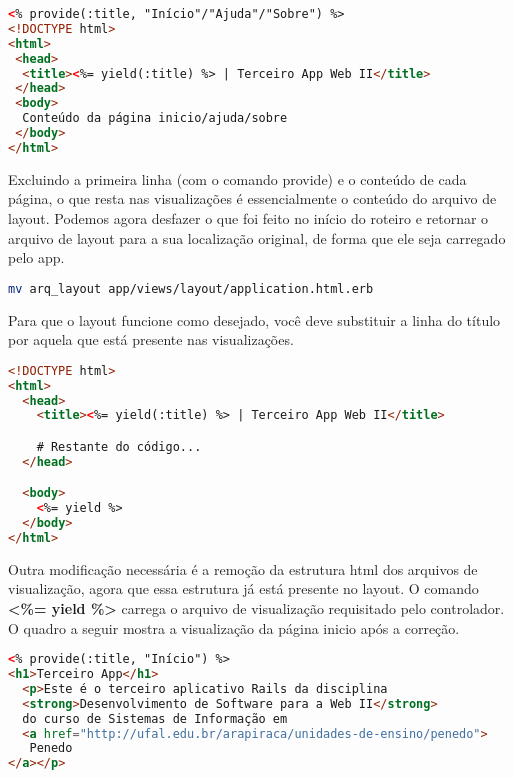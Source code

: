 \documentclass[a4paper,12pt]{article}
\begin{document}
\begin{enumerate}
  \begin{lstlisting}[language=html, basicstyle=\scriptsize]
<% provide(:title, "Início"/"Ajuda"/"Sobre") %>
<!DOCTYPE html>
<html>
 <head>
  <title><%= yield(:title) %> | Terceiro App Web II</title>
 </head>
 <body>
  Conteúdo da página inicio/ajuda/sobre
 </body>
</html>
  \end{lstlisting}

  Excluindo a primeira linha (com o comando provide) e o conteúdo de cada página, o que resta nas visualizações é essencialmente o conteúdo do arquivo de layout. Podemos agora desfazer o que foi feito no início do roteiro e retornar o arquivo de layout para a sua localização original, de forma que ele seja carregado pelo app.

  \begin{lstlisting}[language=Bash, title={terminal, dentro da pasta do terceiro app}]
mv arq_layout app/views/layout/application.html.erb
  \end{lstlisting}

  Para que o layout funcione como desejado, você deve substituir a linha do título por aquela que está presente nas visualizações.

  \begin{lstlisting}[language=html, title=app/views/layouts/application.html.erb, basicstyle=\scriptsize]
<!DOCTYPE html>
<html>
  <head>
    <title><%= yield(:title) %> | Terceiro App Web II</title>

    # Restante do código...
  </head>

  <body>
    <%= yield %>
  </body>
</html>
  \end{lstlisting}

  Outra modificação necessária é a remoção da estrutura html dos arquivos de visualização, agora que essa estrutura já está presente no layout. O comando \textbf{<\%= yield \%>} carrega o arquivo de visualização requisitado pelo controlador. O quadro a seguir mostra a visualização da página inicio após a correção.

    \begin{lstlisting}[language=html, title=app/views/paginas\_estaticas/inicio.html.erb, basicstyle=\scriptsize]
<% provide(:title, "Início") %>
<h1>Terceiro App</h1>
  <p>Este é o terceiro aplicativo Rails da disciplina
  <strong>Desenvolvimento de Software para a Web II</strong>
  do curso de Sistemas de Informação em
  <a href="http://ufal.edu.br/arapiraca/unidades-de-ensino/penedo">
   Penedo
</a></p>
  \end{lstlisting}


\end{enumerate}
\end{document}
